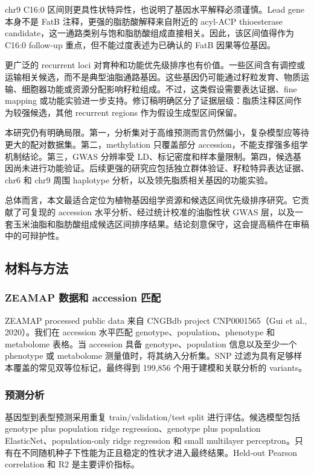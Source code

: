 \documentclass[
]{article}
\begin{document}
chr9 C16:0 区间则更具性状特异性，也说明了基因水平解释必须谨慎。Lead gene
本身不是 FatB 注释，更强的脂肪酸解释来自附近的 acyl-ACP thioesterase
candidate，这一通路类别与饱和脂肪酸组成直接相关。因此，该区间值得作为
C16:0 follow-up 重点，但不能过度表述为已确认的 FatB 因果等位基因。

更广泛的 recurrent loci
对育种和功能优先级排序也有价值。一些区间含有调控或运输相关候选，而不是典型油脂通路基因。这些基因仍可能通过籽粒发育、物质运输、细胞器功能或资源分配影响籽粒组成。不过，这类假设需要表达证据、fine
mapping
或功能实验进一步支持。修订稿明确区分了证据层级：脂质注释区间作为较强候选，其他
recurrent regions 作为假设生成型区间保留。

本研究仍有明确局限。第一，分析集对于高维预测而言仍然偏小，复杂模型应等待更大的配对数据集。第二，methylation
只覆盖部分 accession，不能支撑强多组学机制结论。第三，GWAS 分辨率受
LD、标记密度和样本量限制。第四，候选基因尚未进行功能验证。后续更强的研究应包括独立群体验证、籽粒特异表达证据、chr6
和 chr9 周围 haplotype 分析，以及领先脂质相关基因的功能实验。

总体而言，本文最适合定位为植物基因组学资源和候选区间优先级排序研究。它贡献了可复现的
accession 水平分析、经过统计校准的油脂性状 GWAS
层，以及一套玉米油脂和脂肪酸组成候选区间排序结果。结论刻意保守，这会提高稿件在审稿中的可辩护性。

\subsection{材料与方法}\label{ux6750ux6599ux4e0eux65b9ux6cd5}

\subsubsection{ZEAMAP 数据和 accession
匹配}\label{zeamap-ux6570ux636eux548c-accession-ux5339ux914d}

ZEAMAP processed public data 来自 CNGBdb project CNP0001565（Gui et al.,
2020）。我们在 accession 水平匹配 genotype、population、phenotype 和
metabolome 表格。当 accession 具备 genotype、population 信息以及至少一个
phenotype 或 metabolome 测量值时，将其纳入分析集。SNP
过滤为具有足够样本覆盖的常见双等位标记，最终得到 199,856
个用于建模和关联分析的 variants。

\subsubsection{预测分析}\label{ux9884ux6d4bux5206ux6790}

基因型到表型预测采用重复 train/validation/test split
进行评估。候选模型包括 genotype plus population ridge
regression、genotype plus population ElasticNet、population-only ridge
regression 和 small multilayer
perceptron。只有在不同随机种子下性能为正且稳定的性状才进入最终结果。Held-out
Pearson correlation 和 R2 是主要评价指标。
\end{document}
